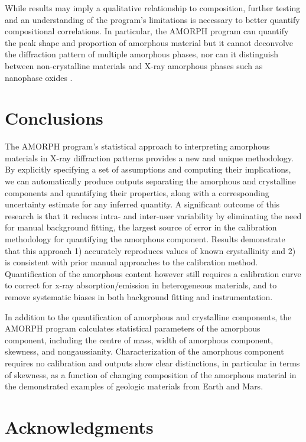 \documentclass[review]{elsarticle}
\begin{document}
While results may imply a qualitative relationship to composition, further testing and an understanding of the program's limitations is necessary to better quantify compositional correlations. In particular, the AMORPH program can quantify the peak shape and proportion of amorphous material but it cannot deconvolve the diffraction pattern of multiple amorphous phases, nor can it distinguish between non-crystalline materials and X-ray amorphous phases such as nanophase oxides \citep{blake2013}. 

\section{Conclusions}\label{sec:conclusions}
The AMORPH program’s statistical approach to interpreting amorphous materials in X-ray
diffraction patterns provides a new and unique methodology.
By explicitly specifying a set of assumptions and computing their
implications, we can automatically produce outputs separating the
amorphous and crystalline components and quantifying their properties,
along with a corresponding uncertainty estimate for any inferred
quantity.
A significant outcome of this research is that it reduces intra- and inter-user variability
by eliminating the need for manual background fitting, the largest source of error in the
calibration methodology for quantifying the amorphous component. Results demonstrate that
this approach 1) accurately reproduces values of known crystallinity and 2) is consistent
with prior manual approaches to the calibration method. Quantification of the amorphous
content however still requires a calibration curve to correct for x-ray absorption/emission
in heterogeneous materials, and to remove systematic biases in both background fitting and instrumentation. 

In addition to the quantification of amorphous and crystalline components, the AMORPH
program calculates statistical parameters of the amorphous component, including the centre
of mass, width of amorphous component, skewness, and nongaussianity. Characterization of the amorphous component requires no calibration and outputs show 
clear distinctions, in particular in terms of skewness, as a function of changing composition of the amorphous material in the demonstrated examples of
geologic materials from Earth and Mars.


\section*{Acknowledgments}
\end{document}
